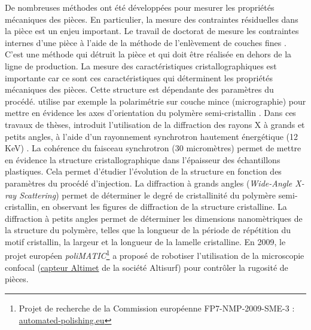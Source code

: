 De nombreuses méthodes ont été développées pour mesurer les propriétés mécaniques des pièces.
En particulier, la mesure des contraintes résiduelles dans la pièce est un enjeu important.
Le travail de doctorat de \citeauthor{giroud_mesure_2001} mesure les contraintes internes d'une pièce à l'aide de la méthode de l'enlèvement de couches fines \cite{giroud_mesure_2001}.
C'est une méthode qui détruit la pièce et qui doit être réalisée en dehors de la ligne de production.
La mesure des caractéristiques cristallographiques est importante car ce sont ces caractéristiques qui déterminent les propriétés mécaniques des pièces.
Cette structure est dépendante des paramètres du procédé.
\citeauthor{mendoza_spatial_2003} utilise par exemple la polarimétrie sur couche mince (micrographie) pour mettre en évidence les axes d'orientation du polymère semi-cristallin \cite{mendoza_spatial_2003}.
Dans ces travaux de thèses, \citeauthor{malhab_moulage_2012} introduit l'utilisation de la diffraction des rayons X à grands et petits angles, à l'aide d'un rayonnement synchrotron hautement énergétique (12 KeV) \cite{malhab_moulage_2012}.
La cohérence du faisceau synchrotron (30 micromètres) permet de mettre en évidence la structure cristallographique dans l'épaisseur des échantillons plastiques.
Cela permet d'étudier l'évolution de la structure en fonction des paramètres du procédé d'injection.
La diffraction à grands angles (\textit{Wide-Angle X-ray Scattering}) permet de déterminer le degré de cristallinité du polymère semi-cristallin, en observant les figures de diffraction de la structure cristalline.  %
La diffraction à petits angles permet de déterminer les dimensions nanomètriques de la structure du polymère, telles que la longueur de la période de répétition du motif cristallin, la largeur et la longueur de la lamelle cristalline.
En 2009, le projet européen \textit{poliMATIC}\footnote{Projet de recherche de la Commission européenne FP7-NMP-2009-SME-3 : \href{https://www.automated-polishing.eu/}{automated-polishing.eu}} a proposé de robotiser l'utilisation de la microscopie confocal (\href{https://www.altimet.fr/?page_id=248}{capteur Altimet} de la société Altisurf) pour contrôler la rugosité de pièces.
